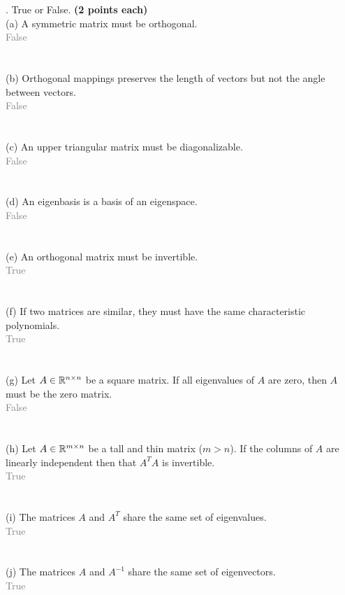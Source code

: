 \documentclass[12pt,a4paper]{article}
\newcommand{\gray}[1]{\textcolor{gray}{#1}}
\newcommand{\x}{\times}
\def\R{\ifmmode\mathbb R\fi}
\begin{document}
\newpage
{}. True or False. \textbf{(2 points each)}\\
(a) A symmetric matrix must be orthogonal. \\
\gray{False}
\\
\\
\\
(b) Orthogonal mappings preserves the length of vectors but not the angle between vectors. \\
\gray{False}
\\
\\
\\
(c) An upper triangular matrix must be diagonalizable. \\
\gray{False}
\\
\\
\\
(d) An eigenbasis is a basis of an eigenspace. \\
\gray{False}
\\
\\
\\
(e) An orthogonal matrix must be invertible. \\
\gray{True}
\\
\\
\\
(f) If two matrices are similar, they must have the same characteristic polynomials. \\
\gray{True}
\\
\\
\\
(g) Let $A\in \R^{n\x n}$ be a square matrix. If all eigenvalues of $A$ are zero, then $A$ must be the zero matrix.\\
\gray{False}
\\
\\
\\
(h) Let $A \in \R^{m\x n}$ be a tall and thin matrix ($m > n$). If the columns of $A$ are linearly independent then that $A^TA$ is invertible. \\
\gray{True}
\\
\\
\\
(i) The matrices $A$ and $A^T$ share the same set of eigenvalues. \\
\gray{True}
\\
\\
\\
(j) The matrices $A$ and $A^{-1}$ share the same set of eigenvectors. \\
\gray{True}
\\
\\
\\
\end{document}
